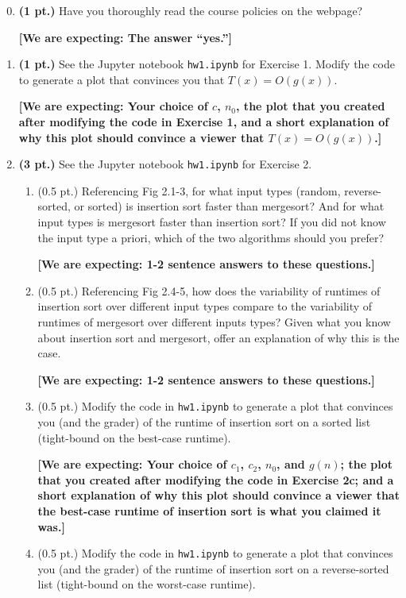 \documentclass{article}
\begin{document}
\begin{enumerate}
  \setcounter{enumi}{-1}
  \item \textbf{(1 pt.)} Have you thoroughly read the course policies on the
    webpage?

    \textbf{[We are expecting: The answer “yes.”]}

  \item \textbf{(1 pt.)} See the Jupyter notebook \texttt{hw1.ipynb} for Exercise 1.
    Modify the code to generate a plot that convinces you that $T(x) = O(g(x))$.

    \textbf{[We are expecting: Your choice of $c$, $n_0$, the plot that you created
    after modifying the code in Exercise 1, and a short explanation of why this plot
    should convince a viewer that $T(x) = O(g(x))$.]}

  \item \textbf{(3 pt.)} See the Jupyter notebook \texttt{hw1.ipynb} for Exercise 2.

    \begin{enumerate}
      \item (0.5 pt.) Referencing Fig 2.1-3, for what input types (random,
        reverse-sorted, or sorted) is insertion sort faster than mergesort? And for
        what input types is mergesort faster than insertion sort? If you did not know
        the input type a priori, which of the two algorithms should you prefer?

        \textbf{[We are expecting: 1-2 sentence answers to these questions.]}
      \item (0.5 pt.) Referencing Fig 2.4-5, how does the variability of runtimes of
        insertion sort over different input types compare to the variability of
        runtimes of mergesort over different inputs types? Given what you know about
        insertion sort and mergesort, offer an explanation of why this is the case.

        \textbf{[We are expecting: 1-2 sentence answers to these questions.]}
      \item (0.5 pt.) Modify the code in \texttt{hw1.ipynb} to generate a plot that
        convinces you (and the grader) of the runtime of insertion sort on a
        sorted list (tight-bound on the best-case runtime).

        \textbf{[We are expecting: Your choice of $c_1$, $c_2$, $n_0$, and $g(n)$;
          the plot that you created after modifying the code in Exercise 2c; and a
          short explanation of why this plot should convince a viewer that the
          best-case runtime of insertion sort is what you claimed it was.]}
      \item (0.5 pt.) Modify the code in \texttt{hw1.ipynb} to generate a plot that
        convinces you (and the grader) of the runtime of insertion sort on a
        reverse-sorted list (tight-bound on the worst-case runtime).


\end{enumerate}
\end{enumerate}
\end{document}
